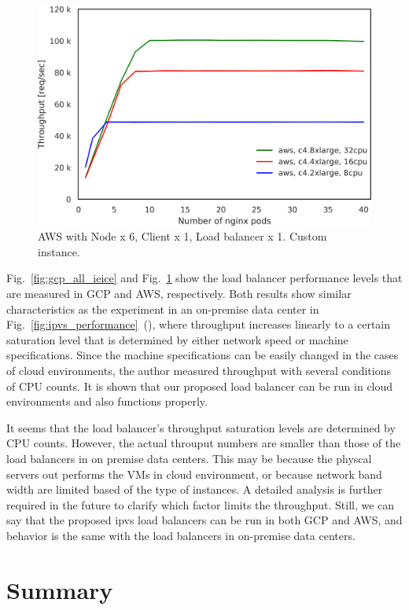 \begin{figure}[t]
  \centering
  \includegraphics[width=0.8\columnwidth]{Figs/aws_c4_tp}
  \caption{AWS with Node x 6, Client x 1, Load balancer x 1. Custom instance. }
  \label{fig:aws_c4_ieice}
\end{figure}

Fig.~\ref{fig:gcp_all_ieice} and Fig.~\ref{fig:aws_c4_ieice} show the load balancer performance levels that are measured in GCP and AWS, respectively.
Both results show similar characteristics as the experiment in an on-premise data center in Fig.~\ref{fig:ipvs_performance}~(), where throughput increases linearly to a certain saturation level that is determined by either network speed or machine specifications.
Since the machine specifications can be easily changed in the cases of cloud environments, the author measured throughput with several conditions of CPU counts.
It is shown that our proposed load balancer can be run in cloud environments and also functions properly.

It seems that the load balancer's throughput saturation levels are determined by CPU counts.
However, the actual throuput numbers are smaller than those of the load balancers in on premise data centers.
This may be because the physcal servers out performs the VMs in cloud environment, or because network band width are limited based of the type of instances. 
A detailed analysis is further required in the future to clarify which factor limits the throughput.
Still, we can say that the proposed ipvs load balancers can be run in both GCP and AWS, and behavior is the same with the load balancers in on-premise data centers.

\FloatBarrier

\section{Summary}


